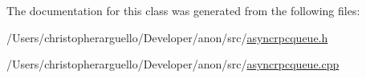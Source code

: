 The documentation for this class was generated from the following files\+:\begin{DoxyCompactItemize}
\item 
/\+Users/christopherarguello/\+Developer/anon/src/\mbox{\hyperlink{asyncrpcqueue_8h}{asyncrpcqueue.\+h}}\item 
/\+Users/christopherarguello/\+Developer/anon/src/\mbox{\hyperlink{asyncrpcqueue_8cpp}{asyncrpcqueue.\+cpp}}\end{DoxyCompactItemize}
